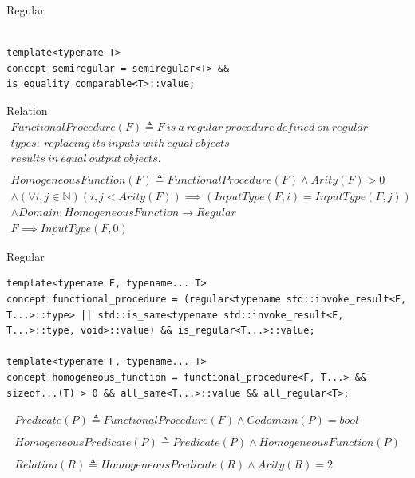 \documentclass[10pt]{beamer}
\begin{document}
\begin{frame}[fragile]{Regular}
\begin{lstlisting}[style=cpp]

template<typename T>
concept semiregular = semiregular<T> && is_equality_comparable<T>::value;

\end{lstlisting}
\end{frame}

\begin{frame}{Relation}
    \begin{align*}
        FunctionalProcedure(F) \triangleq F~is~a~regular~procedure~defined~on~regular~&\\
        types:~replacing~its~inputs~with~equal~objects~\\
        results~in~equal~output~objects. \\\\
        HomogeneousFunction(F) \triangleq FunctionalProcedure(F) \land Arity(F) > 0\\
        \land (\forall i,j \in \mathbb{N})(i,j < Arity(F)) \implies (InputType(F, i) = InputType(F, j))\\
        \land Domain: HomogeneousFunction \rightarrow Regular\\
        F \implies InputType(F, 0)
    \end{align*}
\end{frame}



\begin{frame}[fragile]{Regular}
\begin{lstlisting}[style=cpp]
template<typename F, typename... T>
concept functional_procedure = (regular<typename std::invoke_result<F, T...>::type> || std::is_same<typename std::invoke_result<F, T...>::type, void>::value) && is_regular<T...>::value;

template<typename F, typename... T>
concept homogeneous_function = functional_procedure<F, T...> && sizeof...(T) > 0 && all_same<T...>::value && all_regular<T>;

\end{lstlisting}
\end{frame}



\begin{frame}
\begin{align*}
    Predicate(P) \triangleq FunctionalProcedure(F) \land Codomain(P) = bool\\\\
    HomogeneousPredicate(P) \triangleq Predicate(P) \land HomogeneousFunction(P) \\\\
    Relation(R) \triangleq HomogeneousPredicate(R) \land Arity(R) = 2\\\\
\end{align*}

\end{frame}
\end{document}
